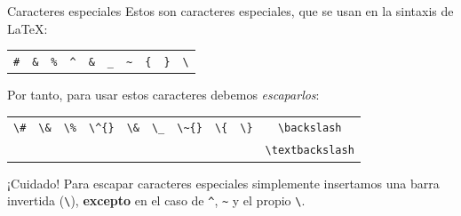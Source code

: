 \documentclass[10pt, xcolor=table]{beamer}
\begin{document}
\begin{frame}{Caracteres especiales}
	Estos son caracteres especiales, que se usan en la sintaxis de \LaTeX{}:
	
	\begin{table}[H]
		\begin{tabular}{llllllllll}
			\texttt{\#} & \texttt{\&} & \texttt{\%} & \texttt{\^{}} & \texttt{\&} & \texttt{\_} & \texttt{\~{}} & \texttt{\{} & \texttt{\}} & \texttt{\textbackslash} \\
		\end{tabular}
	\end{table}
	
	Por tanto, para usar estos caracteres debemos \emph{escaparlos}:
	
	\begin{table}[H]
		\begin{tabular}{cccccccccc}
			\texttt{\textbackslash\#} & \texttt{\textbackslash\&} & \texttt{\textbackslash\%} & \cellcolor[RGB]{203,220,171}\texttt{\textbackslash\^{}\{\}} & \texttt{\textbackslash\&} & \texttt{\textbackslash\_} & \cellcolor[RGB]{203,220,171}\texttt{\textbackslash\~{}\{\}} & \texttt{\textbackslash\{} & \texttt{\textbackslash\}} & \cellcolor[RGB]{203,220,171}\texttt{\textbackslash backslash} \\
			                          &                           &                           &                                                             &                           &                           &                                                             &                           &                           & \scriptsize{\texttt{\textbackslash textbackslash}}            
		\end{tabular}
	\end{table}
	
	\begin{alertblock}{¡Cuidado!}
		Para escapar caracteres especiales simplemente insertamos una barra invertida (\texttt{\textbackslash}), \textbf{excepto} en el caso de \texttt{\^{}}, \texttt{\~{}} y el propio \texttt{\textbackslash}.
	\end{alertblock}
	
\end{frame}
\end{document}
